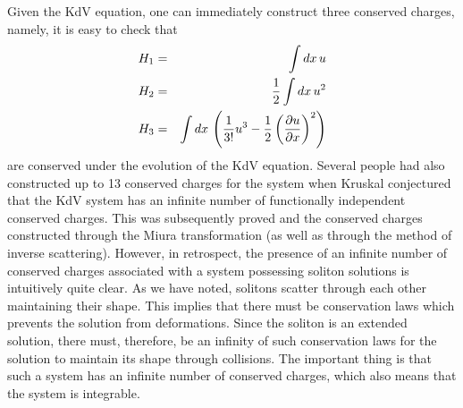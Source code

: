 \documentclass[a4paper,11pt]{article}
\begin{document}

Given the KdV equation, one can immediately construct three conserved
charges, namely, it is easy to check that
\begin{eqnarray}
H_{1} & = & \int dx\, u\nonumber\\
H_{2} & = & {1\over 2} \int dx\, u^{2}\nonumber\\
H_{3} & = & \int dx\,\left({1\over 3!} u^{3} - {1\over 2}
\left({\partial u\over \partial x}\right)^{2}\right)
\end{eqnarray}
are conserved under the evolution of the KdV equation. Several people
had also constructed up to 13 conserved charges for the system when
Kruskal conjectured that the KdV system has an infinite number of
functionally independent conserved charges. This was subsequently
proved and the conserved charges constructed through the Miura
transformation (as well as through the method of inverse
scattering). However, in retrospect, the presence of an infinite
number of conserved charges associated with a system possessing
soliton solutions is intuitively quite clear. As we have noted,
solitons scatter through each other maintaining their shape. This
implies that there must be conservation laws which prevents the
solution from deformations. Since the soliton is an extended solution,
there must, therefore, be an infinity of such conservation laws for
the solution to maintain its shape through collisions. The important
thing is that such a system has an infinite number of conserved
charges, which also means that the system is integrable.

\end{document}
